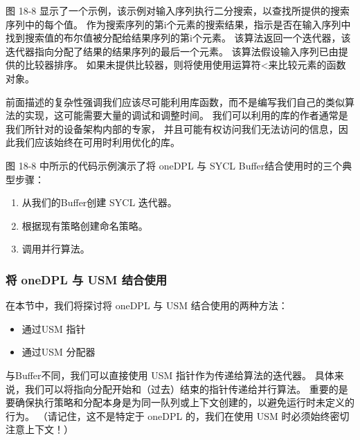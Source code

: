 图 18-8 显示了一个示例，该示例对输入序列执行二分搜索，以查找所提供的搜索序列中的每个值。 
作为搜索序列的第i个元素的搜索结果，指示是否在输入序列中找到搜索值的布尔值被分配给结果序列的第i个元素。 
该算法返回一个迭代器，该迭代器指向分配了结果的结果序列的最后一个元素。 
该算法假设输入序列已由提供的比较器排序。 如果未提供比较器，则将使用使用运算符<来比较元素的函数对象。

前面描述的复杂性强调我们应该尽可能利用库函数，而不是编写我们自己的类似算法的实现，这可能需要大量的调试和调整时间。 
我们可以利用的库的作者通常是我们所针对的设备架构内部的专家，
并且可能有权访问我们无法访问的信息，因此我们应该始终在可用时利用优化的库。

图 18-8 中所示的代码示例演示了将 oneDPL 与 SYCL Buffer结合使用时的三个典型步骤：

\begin{enumerate}
	\item 从我们的Buffer创建 SYCL 迭代器。

	\item 根据现有策略创建命名策略。

	\item 调用并行算法。
\end{enumerate}

\subsubsection{将 oneDPL 与 USM 结合使用}
在本节中，我们将探讨将 oneDPL 与 USM 结合使用的两种方法：

\begin{itemize}
	\item 通过USM 指针

	\item 通过USM 分配器
\end{itemize}

与Buffer不同，我们可以直接使用 USM 指针作为传递给算法的迭代器。 
具体来说，我们可以将指向分配开始和（过去）结束的指针传递给并行算法。 
重要的是要确保执行策略和分配本身是为同一队列或上下文创建的，以避免运行时未定义的行为。 
（请记住，这不是特定于 oneDPL 的，我们在使用 USM 时必须始终密切注意上下文！）

